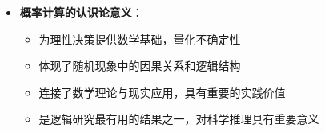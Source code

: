 \begin{center}
{{\begin{itemize}
\begin{itemize}
  \item \textbf{对立事件}：$P(A \cap B) = 0$且$P(A \cup B) = 1$，互斥且必有一个发生
  \item \textbf{条件独立}：在给定条件下的独立性，$P(A \cap B | C) = P(A|C) \cdot P(B|C)$
  \end{itemize}
\item \textbf{概率计算的认识论意义}：
  \begin{itemize}
  \item 为理性决策提供数学基础，量化不确定性
  \item 体现了随机现象中的因果关系和逻辑结构
  \item 连接了数学理论与现实应用，具有重要的实践价值
  \item 是逻辑研究最有用的结果之一，对科学推理具有重要意义
  \end{itemize}
\end{itemize}
}}
\end{center}